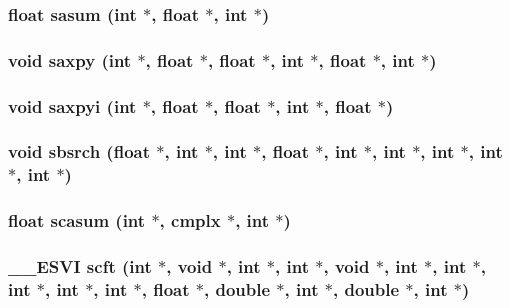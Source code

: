 \subsubsection{\setlength{\rightskip}{0pt plus 5cm}float sasum (int $\ast$, float $\ast$, int $\ast$)}\label{essl_8h_06bfa1dfc17222eb32a1cc04f56a195a}


\subsubsection{\setlength{\rightskip}{0pt plus 5cm}void saxpy (int $\ast$, float $\ast$, float $\ast$, int $\ast$, float $\ast$, int $\ast$)}\label{essl_8h_013cd673719910347089f085b9309a5a}


\subsubsection{\setlength{\rightskip}{0pt plus 5cm}void saxpyi (int $\ast$, float $\ast$, float $\ast$, int $\ast$, float $\ast$)}\label{essl_8h_5f4b8d835d927960d9d8476078223324}


\subsubsection{\setlength{\rightskip}{0pt plus 5cm}void sbsrch (float $\ast$, int $\ast$, int $\ast$, float $\ast$, int $\ast$, int $\ast$, int $\ast$, int $\ast$, int $\ast$)}\label{essl_8h_5a4e2d529843293a893d2989a6e7d31f}


\subsubsection{\setlength{\rightskip}{0pt plus 5cm}float scasum (int $\ast$, {\bf cmplx} $\ast$, int $\ast$)}\label{essl_8h_3c64aa73357e70979e197c79b7d23290}


\subsubsection{\setlength{\rightskip}{0pt plus 5cm}\_\-\_\-ESVI scft (int $\ast$, void $\ast$, int $\ast$, int $\ast$, void $\ast$, int $\ast$, int $\ast$, int $\ast$, int $\ast$, int $\ast$, float $\ast$, double $\ast$, int $\ast$, double $\ast$, int $\ast$)}\label{essl_8h_cc8f97d7954f252cb91bf146bfe50753}


